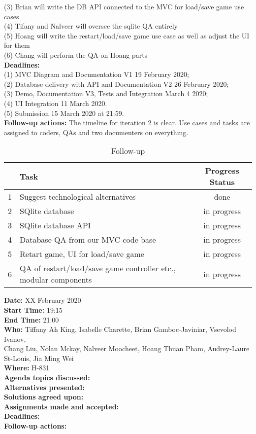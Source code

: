 \documentclass[12pt]{article}
\begin{document}
(3) Brian will write the DB API connected to the MVC for load/save game use cases\\
(4) Tifany and Nalveer will oversee the sqlite QA entirely\\
(5) Hoang will write the restart/load/save game use case as well as adjust the UI for them\\
(6) Chang will perform the QA on Hoang parts\\
{\bf Deadlines:} \\
(1) MVC Diagram and Documentation V1 19 February 2020;\\
(2) Database delivery with API and Documentation V2 26 February 2020;\\
(3) Demo, Documentation V3, Tests and Integration March 4 2020; \\
(4) UI Integration 11 March 2020. \\
(5) Submission 15 March 2020 at 21:59. \\
{\bf Follow-up actions:} The timeline for iteration 2 is clear. Use cases and tasks are assigned to coders, QAs and two documenters on everything.\\

\begin{table}[h!]
\centering
 \begin{tabular}{||l l c ||} 
 \hline
   & Task & Progress Status\\ [0.5ex] 
 \hline\hline
 1 & Suggest technological alternatives & done \\
 2 & SQlite database & in progress\\
 3 & SQlite database API & in progress\\
 4 & Database QA from our MVC code base & in progress\\
 5 & Retart game, UI for load/save game & in progress\\
 6 & QA of restart/load/save game controller etc., modular components & in progress\\[1ex] 

 \hline
 \end{tabular}
\caption{Follow-up }
\label{table:1}
\end{table}

\newpage

{\bf Date:} XX February 2020\\
{\bf Start Time:} 19:15\\
{\bf End Time:} 21:00\\
{\bf Who:} Tiffany Ah King, Isabelle Charette, Brian Gamboc-Javiniar, Vsevolod Ivanov,\\
Chang Liu, Nolan Mckay, Nalveer Moocheet, Hoang Thuan Pham, Audrey-Laure St-Louis, Jia Ming Wei\\
{\bf Where:} H-831\\
{\bf Agenda topics discussed:} \\
{\bf Alternatives presented:} \\
{\bf Solutions agreed upon:} \\
{\bf Assignments made and accepted:} \\
{\bf Deadlines:} \\
{\bf Follow-up actions:} \\
\end{document}
